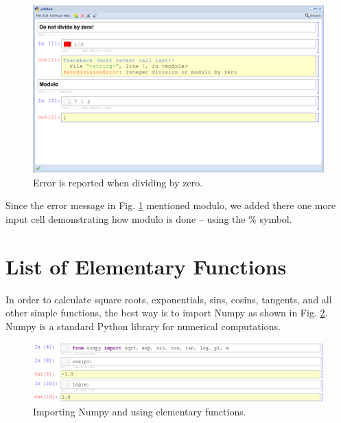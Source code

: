 \documentclass{article}
\begin{document}
\newpage
\begin{figure}[!ht]
\begin{center}
\includegraphics[width=\textwidth]{img/divzero.png}
\end{center}
\caption{Error is reported when dividing by zero.}
\label{fig:divzero}
\end{figure}
\noindent
Since the error message in Fig. \ref{fig:divzero} mentioned modulo, we added there one more 
input cell demonstrating how modulo is done -- using the \% symbol.

\section{List of Elementary Functions}

In order to calculate square roots, exponentials, sins, cosins, tangents, and all other 
simple functions, the best way is to import Numpy as shown in Fig. \ref{fig:fns}. Numpy 
is a standard Python library for numerical computations.

\begin{figure}[!ht]
\begin{center}
\includegraphics[width=\textwidth]{img/fns.png}
\end{center}
\vspace{-4mm}
\caption{Importing Numpy and using elementary functions.}
\label{fig:fns}
\end{figure}
\end{document}
